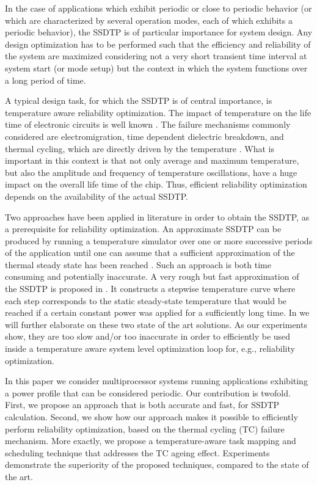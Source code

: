 In the case of applications which exhibit periodic or close to periodic behavior (or which are characterized by several operation modes, each of which exhibits a periodic behavior), the SSDTP is of particular importance for system design. Any design optimization has to be performed such that the efficiency and reliability of the system are maximized considering not a very short transient time interval at system start (or mode setup) but the context in which the system functions over a long period of time.

A typical design task, for which the SSDTP is of central importance, is temperature aware reliability optimization. The impact of temperature on the life time of electronic circuits is well known \cite{srinivasan2004, coskun2006, xiang2010, jedec2010}. The failure mechanisms commonly considered are electromigration, time dependent dielectric breakdown, and thermal cycling, which are directly driven by the temperature \cite{jedec2010}. What is important in this context is that not only average and maximum temperature, but also the amplitude and frequency of temperature oscillations, have a huge impact on the overall life time of the chip. Thus, efficient reliability optimization depends on the availability of the actual SSDTP.

Two approaches have been applied in literature in order to obtain the SSDTP, as a prerequisite for reliability optimization. An approximate SSDTP can be produced by running a temperature simulator over one or more successive periods of the application until one can assume that a sufficient approximation of the thermal steady state has been reached \cite{srinivasan2004}. Such an approach is both time consuming and potentially inaccurate. A very rough but fast approximation of the SSDTP is proposed in \cite{huang2009}. It constructs a stepwise temperature curve where each step corresponds to the static steady-state temperature that would be reached if a certain constant power was applied for a sufficiently long time. In  we will further elaborate on these two state of the art solutions. As our experiments show, they are too slow and/or too inaccurate in order to efficiently be used inside a temperature aware system level optimization loop for, e.g., reliability optimization.

In this paper we consider multiprocessor systems running applications exhibiting a power profile that can be considered periodic. Our contribution is twofold. First, we propose an approach that is both accurate and fast, for SSDTP calculation. Second, we show how our approach makes it possible to efficiently perform reliability optimization, based on the thermal cycling (TC) failure mechanism. More exactly, we propose a temperature-aware task mapping and scheduling technique that addresses the TC ageing effect. Experiments demonstrate the superiority of the proposed techniques, compared to the state of the art.

